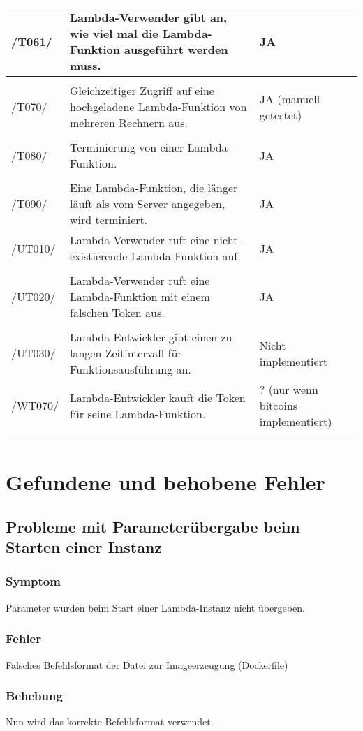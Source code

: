 \documentclass[a4paper,20pt,oneside]{book}
\begin{document}
\begin{longtable}{lp{10cm}p{3cm}}
		/T061/ & Lambda-Verwender gibt an, wie viel mal die Lambda-Funktion ausgeführt werden muss. & JA\\ \hline \\
		/T070/ & Gleichzeitiger Zugriff auf eine hochgeladene Lambda-Funktion von mehreren Rechnern aus. & JA (manuell getestet)\\ \hline \\
		/T080/ & Terminierung von einer Lambda-Funktion. & JA\\ \hline \\
		/T090/ & Eine Lambda-Funktion, die länger läuft als vom Server angegeben, wird terminiert. & JA\\ \hline 
		/UT010/ & Lambda-Verwender ruft eine nicht-existierende Lambda-Funktion auf. & JA\\ \hline \\
		/UT020/ & Lambda-Verwender ruft eine Lambda-Funktion mit einem falschen Token aus. & JA\\ \hline \\
		/UT030/ & Lambda-Entwickler gibt einen zu langen Zeitintervall für Funktionsausführung an. & Nicht implementiert \\  \hline 
		/WT070/ & Lambda-Entwickler kauft die Token für seine Lambda-Funktion. &? (nur wenn bitcoins implementiert)\\ \hline 
		\hline
		\\\\
	\end{longtable}
	
	\chapter{Gefundene und behobene Fehler}
	\section{Probleme mit Parameterübergabe beim Starten einer Instanz}
	\subsection{Symptom}
	Parameter wurden beim Start einer Lambda-Instanz nicht übergeben.
	\subsection{Fehler}
	Falsches Befehlsformat der Datei zur Imageerzeugung (Dockerfile)
	\subsection{Behebung}
	Nun wird das korrekte Befehlsformat verwendet.
	
\end{document}
